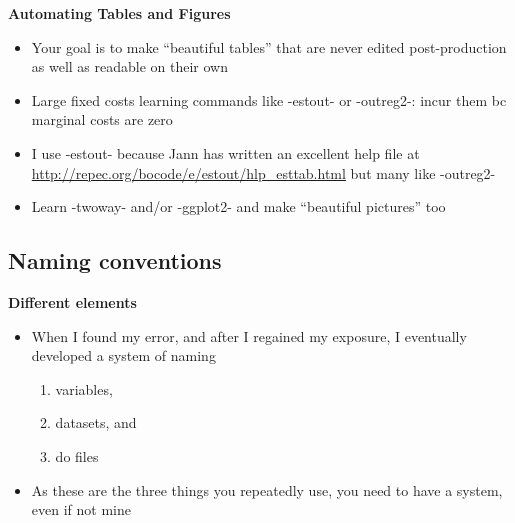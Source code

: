 \documentclass[notes=show]{beamer}
\begin{document}
\begin{frame}[plain]
\begin{center}
\textbf{Automating Tables and Figures}
\end{center}

\begin{itemize}
\item Your goal is to make ``beautiful tables'' that are never edited post-production as well as readable on their own
\item Large fixed costs learning commands like -estout- or -outreg2-: incur them bc marginal costs are zero
\item I use -estout- because Jann has written an excellent help file at \url{http://repec.org/bocode/e/estout/hlp_esttab.html} but many like -outreg2- 
\item Learn -twoway- and/or -ggplot2- and make ``beautiful pictures'' too
\end{itemize}
\end{frame}



\subsection{Naming conventions}

\begin{frame}
\begin{center}
\textbf{Different elements}
\end{center}

\begin{itemize}
\item When I found my error, and after I regained my exposure, I eventually developed a system of naming
	\begin{enumerate}
	\item  variables, 
	\item datasets, and 
	\item do files
	\end{enumerate}
\item As these are the three things you repeatedly use, you need to have a system, even if not mine
\end{itemize}

\end{frame}
\end{document}
